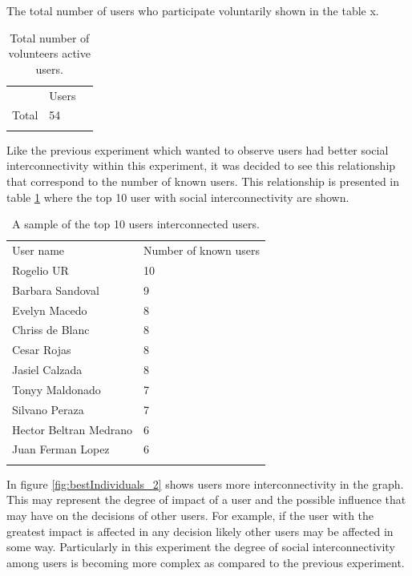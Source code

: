 The total number of users who participate voluntarily shown in the table x.

\begin{table}
\small
\caption{Total number of volunteers active users.}
\label{tab:totalUsers_1}
\centering
\small
\begin{tabular}{p{3cm} p{3cm} p{3cm} }
\hline\noalign{\smallskip}
  & Users &  \\
\noalign{\smallskip}\hline\noalign{\smallskip}
\small{Total } & \small{54} & \\ \hline
\noalign{\smallskip}\hline
\end{tabular}
\end{table}

Like the previous experiment which wanted to observe users had better social
interconnectivity within this experiment, it was decided to see this
relationship that correspond to the number of known users. This relationship is
presented in table \ref{tab:totalUsers_1} where the top 10 user  with social
interconnectivity are shown.


\begin{table}
\small
\caption{A sample of the top 10 users interconnected users.}
\label{tab:knownUsers_2}
\centering
\small
\begin{tabular}{p{3cm} p{3cm}  }
\hline\noalign{\smallskip}
 User name & Number of known users \\
\noalign{\smallskip}\hline\noalign{\smallskip}
\small{Rogelio UR} & \small{10}  \\ \hline
\small{Barbara Sandoval} & \small{9}  \\ \hline
\small{Evelyn Macedo} & \small{8}  \\ \hline
\small{Chriss de Blanc} & \small{8}  \\ \hline
\small{Cesar Rojas} & \small{8}  \\ \hline
\small{Jasiel Calzada} & \small{8}  \\ \hline
\small{Tonyy Maldonado} & \small{7}  \\ \hline
\small{Silvano Peraza} & \small{7}  \\ \hline
\small{Hector Beltran Medrano} & \small{6}  \\ \hline
\small{Juan Ferman Lopez} & \small{6}  \\ \hline
\noalign{\smallskip}\hline
\end{tabular}
\end{table}

In figure \ref{fig:bestIndividuals_2} shows users more interconnectivity in the
graph. This may represent the degree of impact of a user and the possible
influence that may have on the decisions of other users.  For example, if the
user with the greatest impact is affected in any decision likely other users may
be affected in some way. Particularly in this experiment the degree of social
interconnectivity among users is becoming more complex as compared to the
previous experiment.

